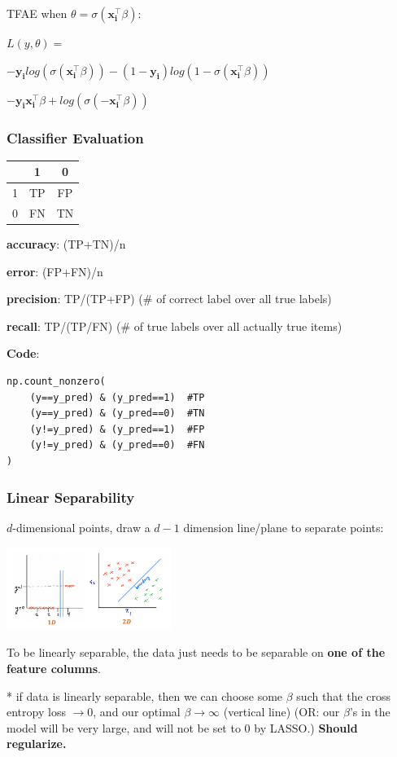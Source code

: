 \documentclass[8pt]{extarticle}
\begin{document}
TFAE when $\theta = \sigma(\mathbf{x_i^\top}\beta) $: \par
$L(y, \theta) =$ \par
$-\mathbf{y_i}log(\sigma(\mathbf{x_i^\top}\beta)) - (1-\mathbf{y_i})log(1-\sigma(\mathbf{x_i^\top}\beta))$ \par
$-\mathbf{y_i}\mathbf{x_i^\top}\beta +log(\sigma(-\mathbf{x_i^\top}\beta))$ \par

\subsubsection*{Classifier Evaluation}
\begin{center}
\begin{tabular}{ |c| c |c| } 
\hline
  & 1 & 0 \\ 
 \hline
 1 & TP & FP \\  
 \hline
 0 & FN & TN \\
 \hline
\end{tabular}
\end{center}

\textbf{accuracy}: (TP+TN)/n \par
\textbf{error}: (FP+FN)/n \par
\textbf{precision}: TP/(TP+FP) (\# of correct label over all true labels) \par
\textbf{recall}: TP/(TP/FN) (\# of true labels over all actually true items) \par

\textbf{Code}:
\begin{verbatim}
np.count_nonzero(
    (y==y_pred) & (y_pred==1)  #TP
    (y==y_pred) & (y_pred==0)  #TN
    (y!=y_pred) & (y_pred==1)  #FP
    (y!=y_pred) & (y_pred==0)  #FN
)
\end{verbatim}

\subsubsection*{Linear Separability}
$d$-dimensional points, draw a $d-1$ dimension line/plane to separate points:\par
\begin{center}\includegraphics[width=0.4\textwidth]{separate}\par \end{center}
To be linearly separable, the data just needs to be separable on \textbf{one of the feature columns}. \par
* if data is linearly separable, then we can choose some $\beta$ such that the cross entropy loss $\rightarrow0$, and our optimal $\beta \rightarrow \infty$ (vertical line)  (OR: our $\beta$'s in the model will be very large, and will not be set to 0 by LASSO.) \textbf{Should regularize.}\\ 
\hline
\end{document}
